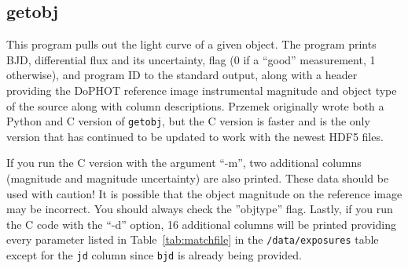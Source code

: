 \documentclass[11pt]{article}
\begin{document}
\subsection{getobj}

This program pulls out the light curve of a given object. The program prints BJD, differential flux and its uncertainty, flag (0 if a ``good'' measurement, 1 otherwise), and program ID to the standard output, along with a header providing the DoPHOT reference image instrumental magnitude and object type of the source along with column descriptions. Przemek originally wrote both a Python and C version of {\tt getobj}, but the C version is faster and is the only version that has continued to be updated to work with the newest HDF5 files.

\vspace{0.2cm}
If you run the C version with the argument ``-m'', two additional columns (magnitude and magnitude uncertainty) are also printed. These data should be used with caution! It is possible that the object magnitude on the reference image may be incorrect. You should always check the ''objtype'' flag. Lastly, if you run the C code with the ``-d'' option, 16 additional columns will be printed providing every parameter listed in Table~\ref{tab:matchfile} in the {\tt /data/exposures} table except for the {\tt jd} column since {\tt bjd} is already being provided.
\end{document}
